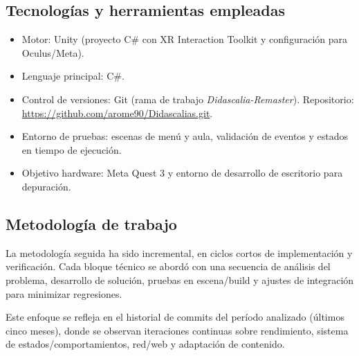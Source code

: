 \subsection{Tecnologías y herramientas empleadas}
\begin{itemize}[leftmargin=1.5em]
    \item Motor: Unity (proyecto C\# con XR Interaction Toolkit y configuración para Oculus/Meta).
    \item Lenguaje principal: C\#.
    \item Control de versiones: Git (rama de trabajo \textit{Didascalia-Remaster}). Repositorio: \url{https://github.com/arome90/Didascalias.git}.
    \item Entorno de pruebas: escenas de menú y aula, validación de eventos y estados en tiempo de ejecución.
    \item Objetivo hardware: Meta Quest 3 y entorno de desarrollo de escritorio para depuración.
\end{itemize}

\subsection{Metodología de trabajo}
La metodología seguida ha sido incremental, en ciclos cortos de implementación y verificación. Cada bloque técnico se abordó con una secuencia de análisis del problema, desarrollo de solución, pruebas en escena/build y ajustes de integración para minimizar regresiones.\par

Este enfoque se refleja en el historial de commits del período analizado (últimos cinco meses), donde se observan iteraciones continuas sobre rendimiento, sistema de estados/comportamientos, red/web y adaptación de contenido.\par